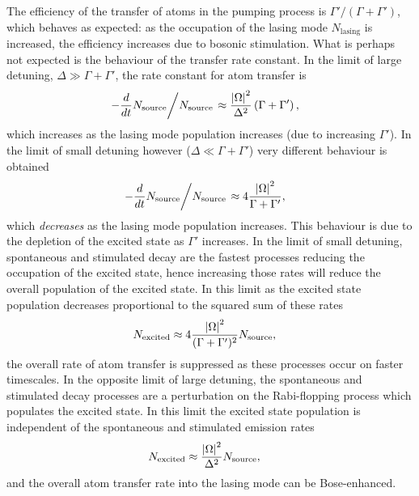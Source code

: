 The efficiency of the transfer of atoms in the pumping process is $\Gamma'/(\Gamma + \Gamma')$, which behaves as expected: as the occupation of the lasing mode $N_\text{lasing}$ is increased, the efficiency increases due to bosonic stimulation.  What is perhaps not expected is the behaviour of the transfer rate constant.  In the limit of large detuning, $\Delta \gg \Gamma + \Gamma'$, the rate constant for atom transfer is
\begin{align}
    \left.-\frac{d}{dt} N_\text{source}\middle/N_\text{source}\right. &\approx \frac{\abs{\Omega}^2}{\Delta^2} \left(\Gamma + \Gamma'\right), \label{OpticalPumping:SingleModePumpingRateLargeDetuning}
\end{align}
which increases as the lasing mode population increases (due to increasing $\Gamma'$).  In the limit of small detuning however ($\Delta \ll \Gamma + \Gamma'$) very different behaviour is obtained
\begin{align}
    \left.-\frac{d}{dt} N_\text{source}\middle/N_\text{source}\right. &\approx 4 \frac{\abs{\Omega}^2}{\Gamma + \Gamma'}, \label{OpticalPumping:SingleModePumpingRateZeroDetuning}
\end{align}
which \emph{decreases} as the lasing mode population increases.  This behaviour is due to the depletion of the excited state as $\Gamma'$ increases.  In the limit of small detuning, spontaneous and stimulated decay are the fastest processes reducing the occupation of the excited state, hence increasing those rates will reduce the overall population of the excited state.  In this limit as the excited state population decreases proportional to the squared sum of these rates
\begin{align}
    N_\text{excited} &\approx 4 \frac{\left|\Omega\right|^2}{(\Gamma + \Gamma')^2} N_\text{source},
\end{align}
the overall rate of atom transfer is suppressed as these processes occur on faster timescales.  In the opposite limit of large detuning, the spontaneous and stimulated decay processes are a perturbation on the Rabi-flopping process which populates the excited state.  In this limit the excited state population is independent of the spontaneous and stimulated emission rates
\begin{align}
    N_\text{excited} &\approx \frac{\left|\Omega\right|^2}{\Delta^2} N_\text{source},
\end{align}
and the overall atom transfer rate into the lasing mode can be Bose-enhanced.

\parasep

